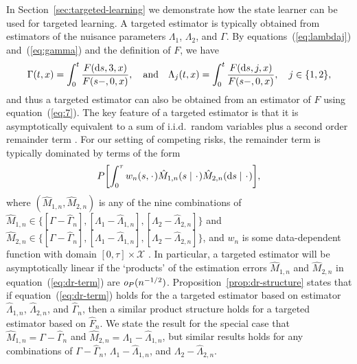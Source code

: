 \documentclass[a4,danish]{article}
\begin{document}
In Section~\ref{sec:targeted-learning} we demonstrate how the state learner can
be used for targeted learning. A targeted estimator is typically obtained from
estimators of the nuisance parameters $\Lambda_1$, $\Lambda_2$, and $\Gamma$. By
equations~(\ref{eq:lambdaj}) and~(\ref{eq:gamma}) and the definition of \( F \),
we have
\begin{equation}
  \label{eq:7}
  \Gamma(t , x) 
  = \int_0^t  \frac{F(\mathop{}\!\mathrm{d} s, 3, x )}{F(s-, 0, x )},
  \quad \text{and} \quad
  \Lambda_j(t , x) 
  = \int_0^t  \frac{F(\mathop{}\!\mathrm{d} s, j, x )}{F(s-, 0, x )},
  \quad j \in \{1,2\},
\end{equation}
and thus a targeted estimator can also be obtained from an estimator of $F$
using equation~(\ref{eq:7}). The key feature of a targeted estimator is that it
is asymptotically equivalent to a sum of i.i.d.\ random variables plus a second
order remainder term \citep{bickel1993efficient,fisher2021visually}. For our
setting of competing risks, the remainder term is typically dominated by terms
of the form
\begin{equation}
  \label{eq:dr-term}
  P{\left[
      \int_0^{\tau} w_n(s, \blank)
      \hat{M}_{1,n}(s \mid  \blank)
      \hat{M}_{2,n}(\diff s \mid  \blank)
    \right]},
\end{equation}
where \( (\hat{M}_{1,n}, \hat{M}_{2,n}) \) is any of the nine combinations of
\( \hat{M}_{1,n} \in \{[\Gamma -\hat{\Gamma}_n], [\Lambda_1
-\hat{\Lambda}_{1,n}], [\Lambda_2 -\hat{\Lambda}_{2,n}]\} \) and
\( \hat{M}_{2,n} \in \{[\Gamma -\hat{\Gamma}_n], [\Lambda_1
-\hat{\Lambda}_{1,n}], [\Lambda_2 -\hat{\Lambda}_{2,n}]\} \), and \( w_n \) is
some data-dependent function with domain \([0,\tau]\times\mathcal X \)
\citep{van2003unified}. In particular, a targeted estimator will be
asymptotically linear if the `products' of the estimation errors
\( \hat{M}_{1,n} \) and \( \hat{M}_{2,n} \) in equation~(\ref{eq:dr-term}) are
\( \textit{o}_P{(n^{-1/2})}\). Proposition~\ref{prop:dr-structure} states that if
equation~(\ref{eq:dr-term}) holds for the a targeted estimator based on
estimator $\hat{\Lambda}_{1,n}$, $\hat{\Lambda}_{2,n}$, and $\hat{\Gamma}_{n}$,
then a similar product structure holds for a targeted estimator based on
\( \hat{F}_n \). We state the result for the special case that
\(\hat{M}_{1,n}= \Gamma-\hat{\Gamma}_n \) and
\(\hat{M}_{2,n} =\Lambda_1-\hat{\Lambda}_{1,n} \), but similar results holds for
any combinations of \( \Gamma-\hat{\Gamma}_n\),
\( \Lambda_1-\hat{\Lambda}_{1,n} \), and \( \Lambda_2-\hat{\Lambda}_{2,n} \).
\end{document}
